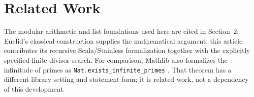 \section{Related Work}
\label{sec:related-work}

The modular-arithmetic and list foundations used here are cited in
Section~2. Euclid's classical construction supplies the mathematical
argument; this article contributes its recursive Scala/Stainless
formalization together with the explicitly specified finite divisor
search. For comparison, Mathlib also formalizes the infinitude of primes
as \texttt{Nat.exists\_infinite\_primes} \cite{mathlib2024infiniteprimes}.
That theorem has a different library setting and statement form; it is
related work, not a dependency of this development.
